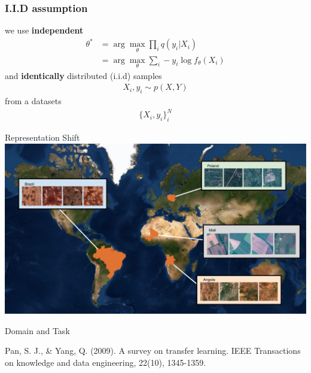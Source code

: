 \documentclass[11pt]{beamer}
\newcommand{\citeapa}[1]{ {\tiny#1\par} }
\begin{document}
	\begin{frame}
		\frametitle{I.I.D assumption}
		

		
		we use \textbf{independent}
		\begin{align*}
			\theta^\ast &= \arg\max_\theta \prod_{i} q(y_i \vert X_i)  \\
			&= \arg\max_\theta \sum_{i} -y_i \log f_\theta(X_i)
		\end{align*}
		 and \textbf{identically} distributed (i.i.d) samples
		 \begin{align}
		 	X_i,y_i \sim p(X, Y)	
		 \end{align}
		 from a datasets
		 \begin{align}
		 	\{X_i,y_i\}_i^N
		 \end{align}
		
	\end{frame}


	\begin{frame}{Representation Shift}
		\includegraphics[width=\textwidth]{images/countries_globe}
	\end{frame}
	
	\begin{frame}{Domain and Task}
		\vfill\tiny
		\citeapa{Pan, S. J., \& Yang, Q. (2009). A survey on transfer learning. IEEE Transactions on knowledge and data engineering, 22(10), 1345-1359.}
		
	\end{frame}
\end{document}
